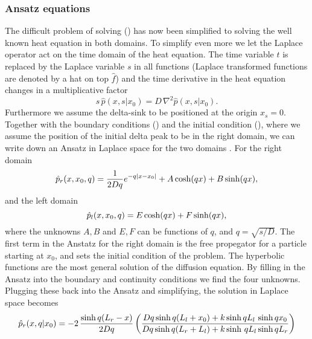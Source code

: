 \subsubsection{Ansatz equations}

The difficult problem of solving () has now been simplified to solving the well known heat equation in both domains. To simplify even more we let the Laplace operator act on the time domain of the heat equation. The time variable $t$ is replaced by the Laplace variable $s$ in all functions (Laplace transformed functions are denoted by a hat on top $\hat{f}$) and the time derivative in the heat equation changes in a multiplicative factor
\begin{equation}
 s \, \hat{p}(x,s|x_0) = D \, \nabla^2 \hat{p}(x,s|x_0).
\end{equation}
Furthermore we assume the delta-sink to be positioned at the origin $x_s=0$. Together with the boundary conditions () and the initial condition (), where we assume the position of the initial delta peak to be in the right domain, we can write down an Ansatz in Laplace space for the two domains \cite{Carslaw1959}. For the right domain
\begin{equation}
 \hat{p}_r(x,x_0,q) = \frac{1}{2 D q} e^{-q |x-x_0|} + A \, \mathrm{cosh} (q x) + B \, \mathrm{sinh} (q x),
 \elabel{Anz_R}
\end{equation}
and the left domain
\begin{equation}
 \hat{p}_l(x,x_0,q) = E \, \mathrm{cosh} (q x) + F \, \mathrm{sinh} (q x),
\elabel{Anz_L}
\end{equation}
where the unknowns $A,B$ and $E,F$ can be functions of $q$, and $q=\sqrt{s/D}$. The first term in the Anstatz for the right domain is the free propegator for a particle starting at $x_0$, and sets the initial condition of the problem. The hyperbolic functions are the most general solution of the diffusion equation. By filling in the Ansatz into the boundary and continuity conditions we find the four unknowns. Plugging these back into the Ansatz and simplifying, the solution in Laplace space becomes
\begin{equation}
 \hat{p}_r(x,q|x_0) = -2 \, \frac{\mathrm{sinh} \, q(L_r - x)}{2 D q} \left( \frac{Dq \, \mathrm{sinh} \, q(L_l + x_0) + k \, \mathrm{sinh} \, q L_l \,\, \mathrm{sinh} \, q x_0}{Dq \, \mathrm{sinh} \, q(L_r + L_l) + k \, \mathrm{sinh} \,\, q L_l \, \mathrm{sinh} \, q L_r} \right)
 \elabel{SOL_R}
\end{equation}

